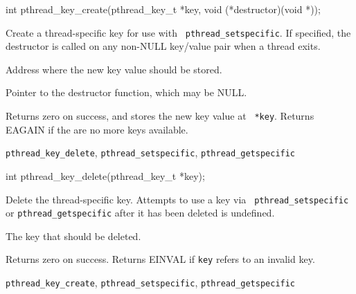 \begin{apisyn}

	\funcproto int pthread_key_create(pthread_key_t *key,
                                          void (*destructor)(void *));
\end{apisyn}
\begin{apidesc}
	Create a thread-specific key for use with {\tt
	pthread_setspecific}.  If specified, the destructor is called on
	any non-NULL key/value pair when a thread exits.
\end{apidesc}
\begin{apiparm}
	\item[key]
		Address where the new key value should be stored.
	\item[destructor]
		Pointer to the destructor function, which may be NULL.
\end{apiparm}
\begin{apiret}
	Returns zero on success, and stores the new key value at {\tt
	*key}. Returns EAGAIN if the are no more keys available.
\end{apiret}
\begin{apirel}
	{\tt pthread_key_delete}, {\tt pthread_setspecific},
	{\tt pthread_getspecific}
\end{apirel}


\begin{apisyn}

	\funcproto int pthread_key_delete(pthread_key_t *key);
\end{apisyn}
\begin{apidesc}
	Delete the thread-specific key. Attempts to use a key via {\tt
	pthread_setspecific} or {\tt pthread_getspecific} after it has been
	deleted is undefined.
\end{apidesc}
\begin{apiparm}
	\item[key]
		The key that should be deleted.
\end{apiparm}
\begin{apiret}
	Returns zero on success. Returns EINVAL if {\tt key} refers to an
	invalid key.
\end{apiret}
\begin{apirel}
	{\tt pthread_key_create}, {\tt pthread_setspecific},
	{\tt pthread_getspecific}
\end{apirel}


